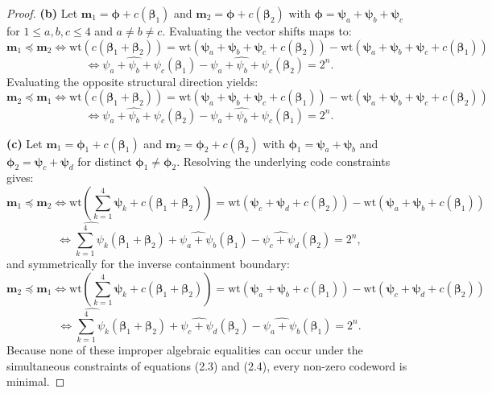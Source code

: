 \documentclass[10pt,a4paper]{amsart}
\begin{document}
\begin{proof}
\textbf{(b)} Let $\mathbf{m}_1 = \boldsymbol{\phi} + c(\mathbf{\beta}_1)$ and $\mathbf{m}_2 = \boldsymbol{\phi} + c(\mathbf{\beta}_2)$ with $\boldsymbol{\phi} = \mathbf{\psi}_a + \mathbf{\psi}_b + \mathbf{\psi}_c$ for $1\leq a,b,c \leq 4$ and $a \neq b \neq c$. Evaluating the vector shifts maps to:
\[
\mathbf{m}_1 \preceq \mathbf{m}_2 \Leftrightarrow 
\mathrm{wt}(c(\mathbf{\beta}_1 + \mathbf{\beta}_2)) 
= \mathrm{wt}(\mathbf{\psi}_a + \mathbf{\psi}_b + \mathbf{\psi}_c + c(\mathbf{\beta}_2)) - \mathrm{wt}(\mathbf{\psi}_a + \mathbf{\psi}_b + \mathbf{\psi}_c + c(\mathbf{\beta}_1))
\]
\[
\Leftrightarrow \widehat{\psi_a + \psi_b + \psi_c}(\mathbf{\beta}_1) - \widehat{\psi_a + \psi_b + \psi_c}(\mathbf{\beta}_2) = 2^n.
\]
Evaluating the opposite structural direction yields:
\[
\mathbf{m}_2 \preceq \mathbf{m}_1 \Leftrightarrow 
\mathrm{wt}(c(\mathbf{\beta}_1 + \mathbf{\beta}_2)) 
= \mathrm{wt}(\mathbf{\psi}_a + \mathbf{\psi}_b + \mathbf{\psi}_c+ c(\mathbf{\beta}_1)) - \mathrm{wt}(\mathbf{\psi}_a + \mathbf{\psi}_b + \mathbf{\psi}_c + c(\mathbf{\beta}_2))
\]
\[
\Leftrightarrow \widehat{\psi_a + \psi_b + \psi_c}(\mathbf{\beta}_2) - \widehat{\psi_a + \psi_b + \psi_c}(\mathbf{\beta}_1) = 2^n.
\]

\textbf{(c)} Let $\mathbf{m}_1 = \boldsymbol{\phi}_1 + c(\mathbf{\beta}_1)$ and $\mathbf{m}_2 = \boldsymbol{\phi}_2 + c(\mathbf{\beta}_2)$ with $\boldsymbol{\phi}_1 = \mathbf{\psi}_a + \mathbf{\psi}_b$ and $\boldsymbol{\phi}_2 = \mathbf{\psi}_c + \mathbf{\psi}_d$ for distinct $\boldsymbol{\phi}_1 \neq \boldsymbol{\phi}_2$. Resolving the underlying code constraints gives:
\[
\mathbf{m}_1 \preceq \mathbf{m}_2 \Leftrightarrow 
\mathrm{wt}\!\left(\sum_{k=1}^{4} \mathbf{\psi}_k + c(\mathbf{\beta}_1 + \mathbf{\beta}_2)\right) 
= \mathrm{wt}(\mathbf{\psi}_c + \mathbf{\psi}_d + c(\mathbf{\beta}_2)) - \mathrm{wt}(\mathbf{\psi}_a + \mathbf{\psi}_b + c(\mathbf{\beta}_1))
\]
\[
\Leftrightarrow \widehat{\sum_{k=1}^{4} \psi_k}(\mathbf{\beta}_1 + \mathbf{\beta}_2) + \widehat{\psi_a + \psi_b}(\mathbf{\beta}_1) - \widehat{\psi_c + \psi_d}(\mathbf{\beta}_2) = 2^n,
\]
and symmetrically for the inverse containment boundary:
\[
\mathbf{m}_2 \preceq \mathbf{m}_1 \Leftrightarrow 
\mathrm{wt}\!\left(\sum_{k=1}^{4} \mathbf{\psi}_k + c(\mathbf{\beta}_1 + \mathbf{\beta}_2)\right) 
= \mathrm{wt}(\mathbf{\psi}_a + \mathbf{\psi}_b + c(\mathbf{\beta}_1)) - \mathrm{wt}(\mathbf{\psi}_c + \mathbf{\psi}_d + c(\mathbf{\beta}_2))
\]
\[
\Leftrightarrow\widehat{\sum_{k=1}^{4} \psi_k}(\mathbf{\beta}_1 + \mathbf{\beta}_2) +   \widehat{\psi_c + \psi_d}(\mathbf{\beta}_2) - \widehat{\psi_a + \psi_b}(\mathbf{\beta}_1) = 2^n.
\]
Because none of these improper algebraic equalities can occur under the simultaneous constraints of equations (2.3) and (2.4), every non-zero codeword is minimal.
\end{proof}
\end{document}
